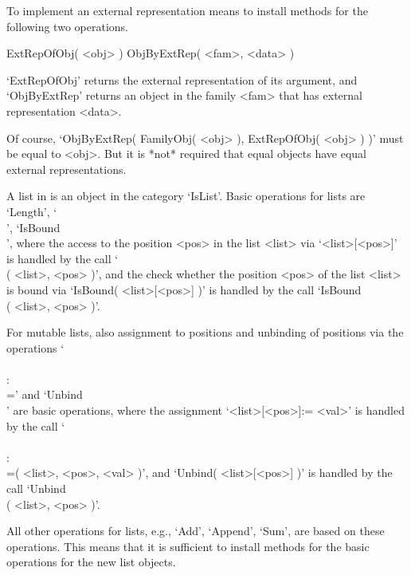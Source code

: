 To implement an external representation means to install methods for the
following two operations.

\>ExtRepOfObj( <obj> )
\>ObjByExtRep( <fam>, <data> )

`ExtRepOfObj' returns the external representation of its argument,
and `ObjByExtRep' returns an object in the family <fam> that has
external representation <data>.

Of course, `ObjByExtRep( FamilyObj( <obj> ), ExtRepOfObj( <obj> ) )'
must be equal to <obj>.
But it is *not* required that equal objects have equal external
representations.



A list in {\GAP} is an object in the category `IsList'.
Basic operations for lists are `Length', `\\[\\]', `IsBound\\[\\]',
where the access to the position <pos> in the list <list>
via `<list>[<pos>]' is handled by the call `\\[\\]( <list>, <pos> )',
and the check whether the position <pos> of the list <list> is bound
via `IsBound( <list>[<pos>] )' is handled by the call
`IsBound\\[\\]( <list>, <pos> )'.

For mutable lists, also assignment to positions and unbinding of
positions via the operations `\\[\\]\\:\\=' and `Unbind\\[\\]'
are basic operations,
where the assignment `<list>[<pos>]:= <val>' is handled by the call
`\\[\\]\\:\\=( <list>, <pos>, <val> )',
and `Unbind( <list>[<pos>] )' is handled by the call
`Unbind\\[\\]( <list>, <pos> )'.

All other operations for lists, e.g., `Add', `Append', `Sum',
are based on these operations.
This means that it is sufficient to install methods for the basic
operations for the new list objects.


